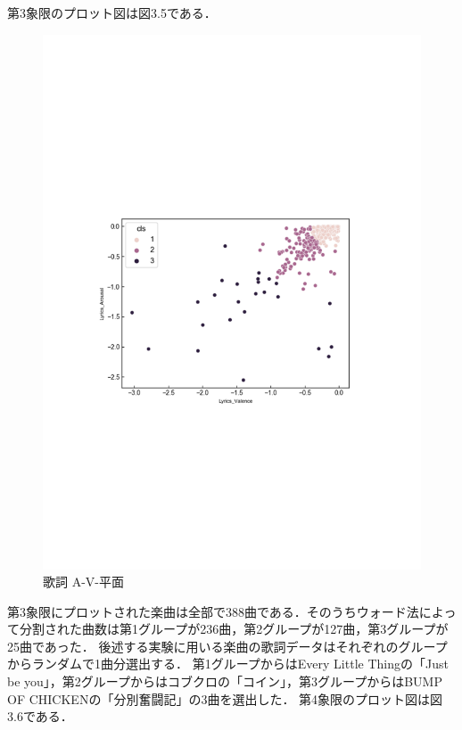 第3象限のプロット図は図3.5である．
\begin{figure}[H]
  \centering
  \includegraphics[width=14cm]{lyrics_A-V-.pdf}
  \vspace{-1mm}
  \caption{歌詞 A-V-平面}
  \label{fig:vkall}
  \vspace{5mm}
\end{figure}
第3象限にプロットされた楽曲は全部で388曲である．そのうちウォード法によって分割された曲数は第1グループが236曲，第2グループが127曲，第3グループが25曲であった．
後述する実験に用いる楽曲の歌詞データはそれぞれのグループからランダムで1曲分選出する．
第1グループからはEvery Little Thingの「Just be you」，第2グループからはコブクロの「コイン」，第3グループからはBUMP OF CHICKENの「分別奮闘記」の3曲を選出した．
\newpage
第4象限のプロット図は図3.6である．
